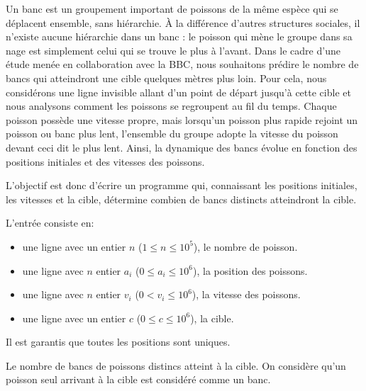 \problemname{}


Un banc est un groupement important de poissons de la même espèce qui se déplacent ensemble, sans hiérarchie. À la différence d'autres structures sociales, il n'existe aucune hiérarchie dans un banc : le poisson qui mène le groupe dans sa nage est simplement celui qui se trouve le plus à l'avant.
Dans le cadre d'une étude menée en collaboration avec la BBC, nous souhaitons prédire le nombre de bancs qui atteindront une cible quelques mètres plus loin.
Pour cela, nous considérons une ligne invisible allant d'un point de départ jusqu'à cette cible et nous analysons comment les poissons se regroupent au fil du temps.
Chaque poisson possède une vitesse propre, mais lorsqu'un poisson plus rapide rejoint un poisson ou banc plus lent, l'ensemble du groupe adopte la vitesse du poisson devant ceci dit le plus lent.
Ainsi, la dynamique des bancs évolue en fonction des positions initiales et des vitesses des poissons.

L'objectif est donc d'écrire un programme qui, connaissant les positions initiales, les vitesses et la cible, détermine combien de bancs distincts atteindront la cible.

\begin{Input}
    L'entrée consiste en:
    \begin{itemize}
        \item une ligne avec un entier $n$ ($1 \leq n \leq 10^{5}$), le nombre de poisson.
        \item une ligne avec $n$ entier $a_i$ ($0 \leq a_i \leq 10^{6}$), la position des poissons.
        \item une ligne avec $n$ entier $v_i$ ($0 < v_i \leq 10^{6}$), la vitesse des poissons.
        \item une ligne avec un entier $c$ ($0 \leq c \leq 10^{6}$), la cible.
    \end{itemize}
    Il est garantis que toutes les positions sont uniques.
\end{Input}

\begin{Output}
   Le nombre de bancs de poissons distincs atteint à la cible. On considère qu'un poisson seul arrivant à la cible est considéré comme un banc.
\end{Output}
